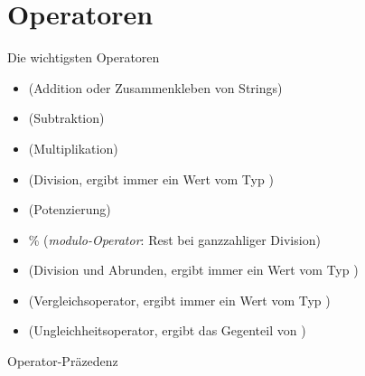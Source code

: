 \section{Operatoren}

\begin{frame}
\begin{block}{Die wichtigsten Operatoren}
	\begin{itemize}
		\item \pybw{+} (Addition oder Zusammenkleben von Strings)
		\item \pybw{-} (Subtraktion)
		\item \pybw{*} (Multiplikation)
		\item \pybw{/} (Division, ergibt immer ein Wert vom Typ )
		\item \pybw{**} (Potenzierung)
			\item \% (\textit{modulo-Operator}: Rest bei ganzzahliger Division)
		\item \pybw{//} (Division und Abrunden, ergibt immer ein Wert vom Typ )
		\item \pybw{==} (Vergleichsoperator, ergibt immer ein Wert vom Typ )
		\item \pybw{!=} (Ungleichheitsoperator, ergibt das Gegenteil von \pybw{==})
	\end{itemize}
\end{block}
\end{frame}

\begin{frame}
\begin{block}{Operator-Präzedenz}
	\uncover<+->{
	\begin{enumerate}[<+->]
		\item Klammern
		\item \pybw{**}
		\item \pybw{*}, \pybw{/}, \pybw{//}, \%
		\item \pybw{+},\pybw{-}
	\end{enumerate}	
	}

\end{block}
\end{frame}

